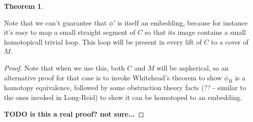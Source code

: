 \documentclass[12pt]{amsart}
\newtheorem{thm}[theorem]{Theorem}
\theoremstyle{definition}
\theoremstyle{remark}
\begin{document}
{\begin{thm}
\end{thm}

Note that we can't guarantee that $\phi'$ is itself an embedding, because for
instance it's easy to map a small straight segment of $C$ so that its image
contains a small homotopicall trivial loop. This loop will be present in every
lift of $C$ to a cover of $M$.

\begin{proof}

Note that when we use this, both $C$ and $M$ will be aspherical, so an
alternative proof for that case is to invoke Whitehead's theorem to show
$\phi_H$ is a homotopy equivalence, followed by some obstruction theory facts
(??  - similar to the ones invoked in Long-Reid) to show it can be homotoped to
an embedding.

\textbf{ TODO is this a real proof? not sure...}

%
%

%
%


\end{proof}}
\end{document}
